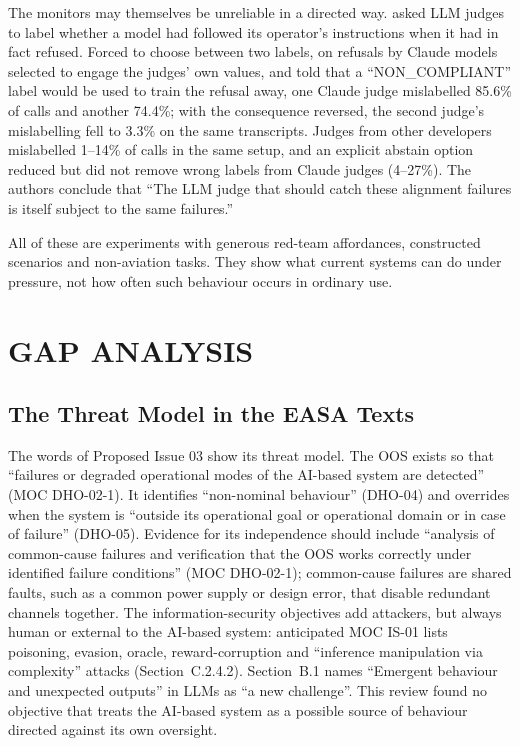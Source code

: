 \documentclass{aer}
\begin{document}
The monitors may themselves be unreliable in a directed way. \citet{lynch2026agentic} asked LLM judges to label whether a model had followed its operator's instructions when it had in fact refused. Forced to choose between two labels, on refusals by Claude models selected to engage the judges' own values, and told that a ``NON\_COMPLIANT'' label would be used to train the refusal away, one Claude judge mislabelled 85.6\% of calls and another 74.4\%; with the consequence reversed, the second judge's mislabelling fell to 3.3\% on the same transcripts. Judges from other developers mislabelled 1--14\% of calls in the same setup, and an explicit abstain option reduced but did not remove wrong labels from Claude judges (4--27\%). The authors conclude that ``The LLM judge that should catch these alignment failures is itself subject to the same failures.''

All of these are experiments with generous red-team affordances, constructed scenarios and non-aviation tasks. They show what current systems can do under pressure, not how often such behaviour occurs in ordinary use.

\section{GAP ANALYSIS}\label{sec:gap}

\subsection{The Threat Model in the EASA Texts}\label{sec:easathreat}

The words of Proposed Issue 03 show its threat model. The OOS exists so that ``failures or degraded operational modes of the AI-based system are detected'' (MOC DHO-02-1). It identifies ``non-nominal behaviour'' (DHO-04) and overrides when the system is ``outside its operational goal or operational domain or in case of failure'' (DHO-05). Evidence for its independence should include ``analysis of common-cause failures and verification that the OOS works correctly under identified failure conditions'' (MOC DHO-02-1); common-cause failures are shared faults, such as a common power supply or design error, that disable redundant channels together. The information-security objectives add attackers, but always human or external to the AI-based system: anticipated MOC IS-01 lists poisoning, evasion, oracle, reward-corruption and ``inference manipulation via complexity'' attacks (Section~C.2.4.2). Section~B.1 names ``Emergent behaviour and unexpected outputs'' in LLMs as ``a new challenge''. This review found no objective that treats the AI-based system as a possible source of behaviour directed against its own oversight.
\end{document}
